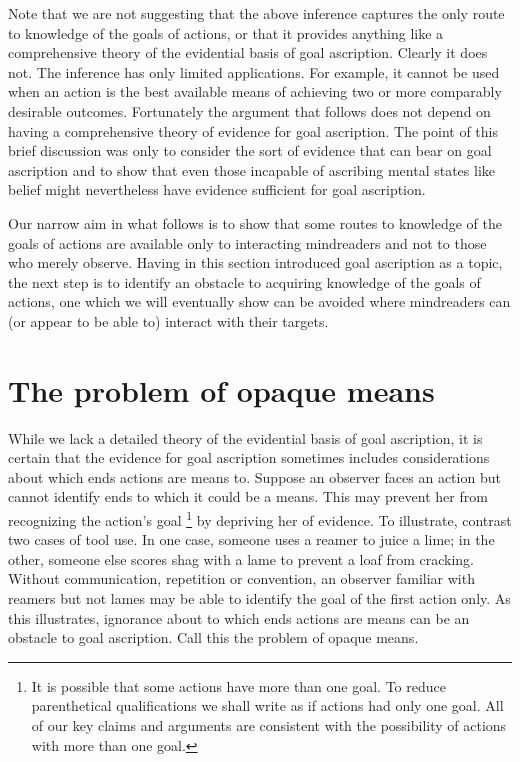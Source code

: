 \documentclass[12pt,a4paper]{extarticle}
\begin{document}
Note that we are not suggesting that the above inference captures the only route to knowledge of the goals of actions,
or that it provides anything like a comprehensive theory of the evidential basis of goal ascription.
Clearly it does not.
The inference has only limited applications.
For example, it cannot be used when an action is the best available means of achieving two or more comparably desirable outcomes. 
Fortunately the argument that follows does not depend on having a comprehensive theory of evidence for goal ascription.
The point of this brief discussion was only to 
consider the sort of evidence that can bear on goal ascription
and to 
show that 
even those incapable of ascribing mental states like belief 
might nevertheless have evidence sufficient for goal ascription.

Our narrow aim in what follows is to show that some routes to knowledge of the goals of actions 
are available only to interacting mindreaders
and not to those who merely observe.
Having in this section introduced goal ascription as a topic,
the next step is to identify an obstacle to acquiring knowledge of the goals of actions,
one which we will eventually show can be avoided where mindreaders can (or appear to be able to) interact with their targets.


\section{The problem of opaque means}
\label{sec:opaque_means}

While we lack a detailed theory of the evidential basis of goal ascription,
it is certain that the evidence for goal ascription sometimes includes considerations about which ends actions are means to.
Suppose an observer faces an action but cannot identify ends to which it could be a means.
This may prevent her from recognizing the action's goal%
\footnote{
It is possible that some actions have more than one goal.
To reduce parenthetical qualifications we shall write as if actions had only one goal.  
All of our key claims and arguments are consistent with the possibility of actions with more than one goal.
} 
 by depriving her of evidence.
To illustrate, contrast two cases of tool use.
In one case, someone uses a reamer to  juice  a lime; in the other, someone else scores shag with a lame to prevent a loaf from cracking.
Without communication, repetition or convention,
an observer familiar with reamers but not lames 
may be able to identify the goal of the first action only.
As this illustrates, ignorance about to which ends actions are means can be an obstacle to goal ascription.
Call this the problem of opaque means.
\end{document}
